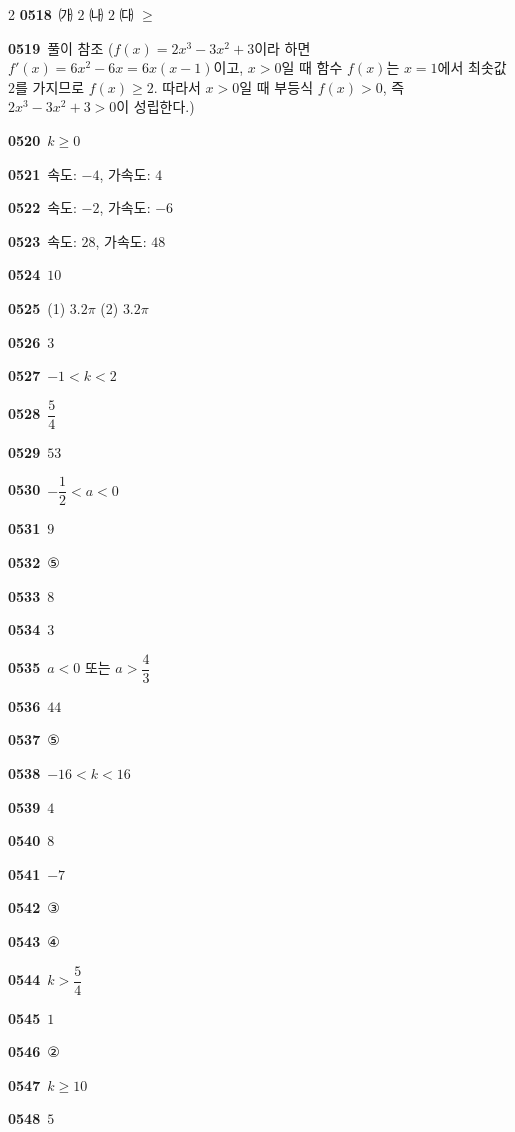 \documentclass[10pt,a4paper]{article}
\begin{document}
\begin{multicols}{2}
\noindent\textbf{0518}\ ㈎ $2$ \quad ㈏ $2$ \quad ㈐ $\ge$\par
\noindent\textbf{0519}\ 풀이 참조 ($f(x)=2x^3-3x^2+3$이라 하면 $f'(x)=6x^2-6x=6x(x-1)$이고, $x>0$일 때 함수 $f(x)$는 $x=1$에서 최솟값 $2$를 가지므로 $f(x)\ge 2$. 따라서 $x>0$일 때 부등식 $f(x)>0$, 즉 $2x^3-3x^2+3>0$이 성립한다.)\par
\noindent\textbf{0520}\ $k\ge 0$\par
\noindent\textbf{0521}\ 속도: $-4$, 가속도: $4$\par
\noindent\textbf{0522}\ 속도: $-2$, 가속도: $-6$\par
\noindent\textbf{0523}\ 속도: $28$, 가속도: $48$\par
\noindent\textbf{0524}\ $10$\par
\noindent\textbf{0525}\ (1) $3.2\pi$ \quad (2) $3.2\pi$\par
\noindent\textbf{0526}\ $3$\par
\noindent\textbf{0527}\ $-1<k<2$\par
\noindent\textbf{0528}\ $\dfrac{5}{4}$\par
\noindent\textbf{0529}\ $53$\par
\noindent\textbf{0530}\ $-\dfrac{1}{2}<a<0$\par
\noindent\textbf{0531}\ $9$\par
\noindent\textbf{0532}\ ⑤\par
\noindent\textbf{0533}\ $8$\par
\noindent\textbf{0534}\ $3$\par
\noindent\textbf{0535}\ $a<0$ 또는 $a>\dfrac{4}{3}$\par
\noindent\textbf{0536}\ $44$\par
\noindent\textbf{0537}\ ⑤\par
\noindent\textbf{0538}\ $-16<k<16$\par
\noindent\textbf{0539}\ $4$\par
\noindent\textbf{0540}\ $8$\par
\noindent\textbf{0541}\ $-7$\par
\noindent\textbf{0542}\ ③\par
\noindent\textbf{0543}\ ④\par
\noindent\textbf{0544}\ $k>\dfrac{5}{4}$\par
\noindent\textbf{0545}\ $1$\par
\noindent\textbf{0546}\ ②\par
\noindent\textbf{0547}\ $k\ge 10$\par
\noindent\textbf{0548}\ $5$\par

\end{multicols}
\end{document}
